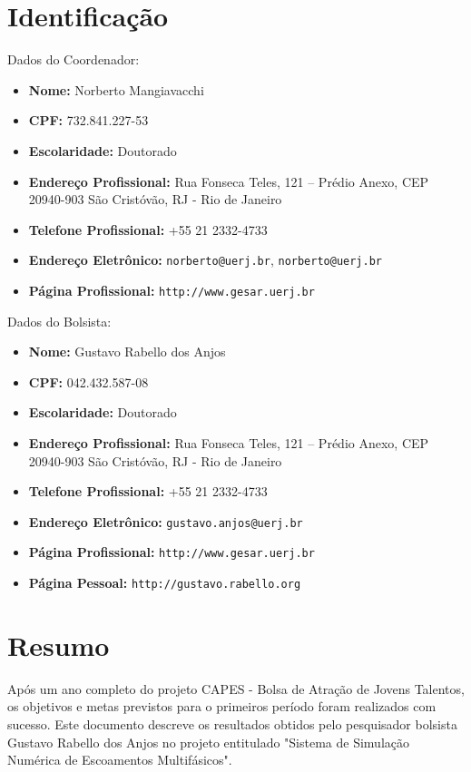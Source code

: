 \documentclass[a4paper,portuges,12pt]{article}
\begin{document}
	


\section{Identificação}

\noindent Dados do Coordenador: 
\begin{itemize}
	\item \textbf{Nome:} Norberto Mangiavacchi
	\item \textbf{CPF:} 732.841.227-53
	\item \textbf{Escolaridade:} Doutorado
	\item \textbf{Endereço Profissional:} Rua Fonseca Teles, 121 --
	Prédio Anexo, CEP 20940-903 São Cristóvão, RJ - Rio de Janeiro
	\item \textbf{Telefone Profissional:} +55 21 2332-4733
	\item \textbf{Endereço Eletrônico:} {\tt norberto@uerj.br}, 
	                                    {\tt norberto@uerj.br}
	\item \textbf{Página Profissional:} {\tt http://www.gesar.uerj.br}
\end{itemize}

\hspace{1cm}

\noindent Dados do Bolsista: 
\begin{itemize}
	\item \textbf{Nome:} Gustavo Rabello dos Anjos
	\item \textbf{CPF:} 042.432.587-08
	\item \textbf{Escolaridade:} Doutorado
	\item \textbf{Endereço Profissional:} Rua Fonseca Teles, 121 --
	Prédio Anexo, CEP 20940-903 São Cristóvão, RJ - Rio de Janeiro
	\item \textbf{Telefone Profissional:} +55 21 2332-4733
	\item \textbf{Endereço Eletrônico:} {\tt gustavo.anjos@uerj.br}
	\item \textbf{Página Profissional:} {\tt http://www.gesar.uerj.br}
	\item \textbf{Página Pessoal:} {\tt http://gustavo.rabello.org}
\end{itemize}

\clearpage

\section{Resumo}
Após um ano completo do projeto CAPES - Bolsa de Atração de Jovens
Talentos, os objetivos e metas previstos para o primeiros período foram
realizados com sucesso. Este documento descreve os resultados obtidos
pelo pesquisador bolsista Gustavo Rabello dos Anjos no projeto
entitulado "Sistema de Simulação Numérica de Escoamentos Multifásicos". 
\clearpage
\end{document}
